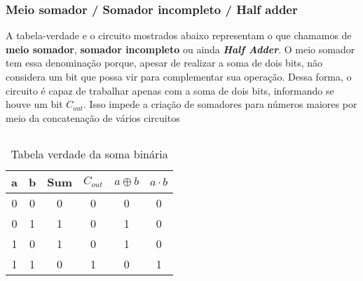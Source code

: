 \begin{frame}
	\frametitle{Meio somador / Somador incompleto / Half adder}
	\par A tabela-verdade e o circuito mostrados abaixo representam o que chamamos de \textbf{meio somador}, \textbf{somador incompleto} ou ainda \textit{\textbf{Half Adder}}. O meio somador tem essa denominação porque, apesar de realizar a soma de dois bits, não considera um bit que possa vir para complementar sua operação. Dessa forma, o circuito é capaz de trabalhar apenas com a soma de dois bits, informando se houve um bit $C_{out}$. Isso impede a criação de somadores para números maiores por meio da concatenação de vários circuitos
	\begin{columns}
		\begin{table}[h!]
			\centering
			\begin{tabular}{|c|c|c|c|c|c|}
				\hline
				a & b & Sum & \(C_{out}\)& \(a \oplus b\) & \(a \cdot b\) \\ \hline
				0 & 0 & 0   & 0          & 0              & 0             \\ \hline
				0 & 1 & 1   & 0          & 1              & 0             \\ \hline
				1 & 0 & 1   & 0          & 1              & 0             \\ \hline
				1 & 1 & 0   & 1          & 0              & 1             \\ \hline
			\end{tabular}
			\caption{Tabela verdade da soma binária}
			\label{tab:binary_addition4}
		\end{table}
		\begin{figure}
			\centering
			
			\label{fig:somadorincompleto2}
		\end{figure}
		
	\end{columns}
\end{frame}
